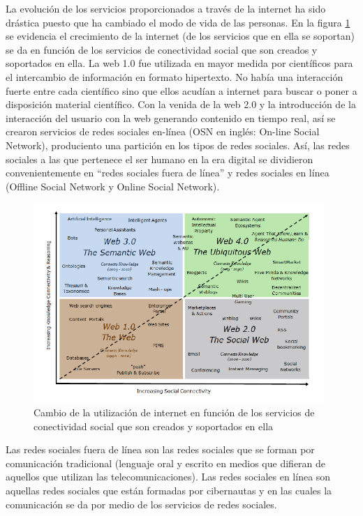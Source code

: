 La evolución de los servicios proporcionados a través de la internet ha sido drástica puesto que ha cambiado el modo de vida de las personas. En la figura \ref{fig:utilizacion_internet} se evidencia el crecimiento de la internet (de los servicios que en ella se soportan) se da en función de los servicios de conectividad social que son creados y soportados en ella. La web 1.0 fue utilizada en mayor medida por científicos para el intercambio de información en formato hipertexto. No había una interacción fuerte entre cada científico sino que ellos acudían a internet para buscar o poner a disposición material científico. Con la venida de la web 2.0 y la introducción de la interacción del usuario con la web generando contenido en tiempo real, así se crearon servicios de redes sociales en-línea (OSN en inglés: On-line Social Network), produciento una partición en los tipos de redes sociales. Así, las redes sociales a las que pertenece el ser humano en la era digital se dividieron convenientemente en “redes sociales fuera de línea” y redes sociales en línea (Offline Social Network y Online Social Network).

\begin{figure}[!htb]
  \begin{center}
    \includegraphics[width=11cm]{./imagenes/utilizacion_internet.png}
    \caption{Cambio de la utilización de internet en función de los servicios de conectividad social que son creados y soportados en ella}
    \label{fig:utilizacion_internet}
  \end{center}
\end{figure}

Las redes sociales fuera de línea son las redes sociales que se forman por comunicación tradicional (lenguaje oral y escrito en medios que difieran de aquellos que utilizan las telecomunicaciones). Las redes sociales en línea son aquellas redes sociales que están formadas por cibernautas y en las cuales la comunicación se da por medio de los servicios de redes sociales.

